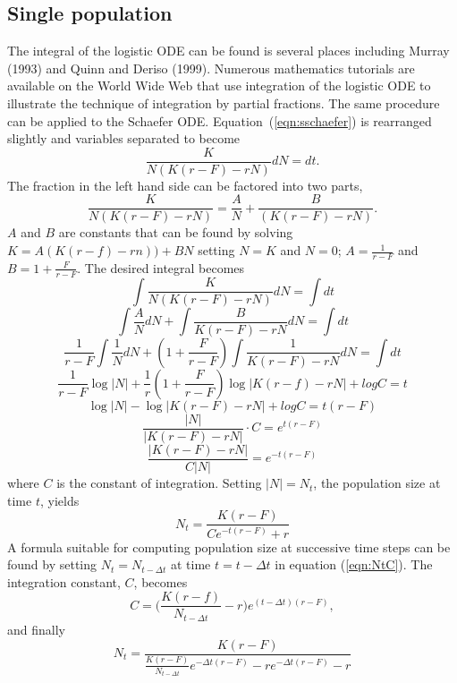 \subsection{Single population}
The integral of the logistic ODE can be found is several places
including Murray (1993) and Quinn and Deriso (1999).
Numerous mathematics tutorials are available on the World Wide Web
that use
integration of the logistic ODE to illustrate the technique of
integration by partial fractions.
The same procedure can be applied to the Schaefer ODE.
Equation~(\ref{eqn:sschaefer}) is rearranged slightly and variables
separated to become
\begin{equation}
\frac{K}{N(K(r-F)-rN)}dN=dt.
\end{equation}
The fraction in the left hand side can be factored into two parts,
\begin{equation}
\frac{K}{N(K(r-F)-rN)}=\frac{A}{N}+\frac{B}{(K(r-F)-rN)}.
\end{equation}
$A$ and $B$ are constants that can be found by solving
$K=A(K(r-f)-rn))+BN$
setting $N=K$ and $N=0$; 
$A=\frac{1}{r-F}$ and $B=1+\frac{F}{r-F}$.
The desired integral becomes
\[\int\frac{K}{N(K(r-F)-rN)}dN   = \int dt\]
\[\int\frac{A}{N}dN + \int\frac{B}{K(r-F)-rN}dN  = \int dt\]
\[\frac{1}{r-F}\int\frac{1}{N}dN + (1+\frac{F}{r-F})\int\frac{1}{K(r-F)-rN}dN  = \int dt\] 
\[\frac{1}{r-F}\log |N| + \frac{1}{r}(1+\frac{F}{r-F})\log |K(r-f)-rN| +log C  = t\] \[\log |N| - \log |K(r-F)-rN| + log C  = t(r-F)\]
\[\frac{|N|}{|K(r-F)-rN|}\cdot C  =  e^{t(r-F)}\]
\[\frac{|K(r-F)-rN|}{C|N|} =  e^{-t(r-F)}\]
where $C$ is the constant of integration.
Setting $|N| = N_t$, the population size at time $t$, yields
\begin{equation}
\label{eqn:NtC}
N_t=\frac{K(r-F)}{Ce^{-t(r-F)}+r}
\end{equation}
A formula suitable for computing population size at successive
time steps can be found by setting $N_t = N_{t-\Delta t}$ at time
$t=t-\Delta t$ in equation (\ref{eqn:NtC}).
The integration constant, $C$, becomes
\begin{equation}
C=\Bigg(\frac{K(r-f)}{N_{t-\Delta t}}-r\Bigg)e^{(t-\Delta t)(r-F)},
\end{equation}
and finally
\begin{equation}
\label{eqn:intschaefer}
N_t = \frac{K(r-F)}{\frac{K(r-F)}{N_{t-\Delta t}}e^{-\Delta t(r-F)}-re^{-\Delta t(r-F)} -r}
\end{equation}

